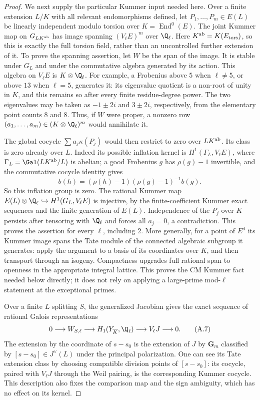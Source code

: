 \begin{proof}
We next supply the particular Kummer input needed here. Over a finite
extension $L/K$ with all relevant endomorphisms defined, let
$P_1,\ldots,P_m\in E(L)$ be linearly independent modulo torsion over
$K=\operatorname{End}^0(E)$. The joint Kummer map on
$G_{L K^{\rm ab}}$ has image spanning $(V_\ell E)^m$ over $\Q_\ell$.
Here $K^{\rm ab}=K(E_{\rm tors})$, so this is exactly the full torsion
field, rather than an uncontrolled further extension of it.
To prove the spanning assertion, let $W$ be the span of the image.
It is stable under $G_L$ and under the commutative algebra generated by
its action. This algebra on $V_\ell E$ is $K\otimes\Q_\ell$.
For example, a Frobenius above $5$ when $\ell\ne5$, or above $13$
when $\ell=5$, generates it: its eigenvalue quotient is a non-root of
unity in $K$, and this remains so after every finite residue-degree
power. The two eigenvalues may be taken as $-1\pm2i$ and $3\pm2i$,
respectively, from the elementary point counts $8$ and $8$.
Thus, if $W$ were proper, a nonzero row
$(a_1,\ldots,a_m)\in(K\otimes\Q_\ell)^m$ would annihilate it.

The global cocycle $\sum a_j\kappa(P_j)$ would then restrict to zero
over $LK^{\rm ab}$. Its class is zero already over $L$. Indeed its
possible inflation kernel is $H^1(\Gamma_L,V_\ell E)$, where
$\Gamma_L=\Gal(LK^{\rm ab}/L)$ is abelian; a good Frobenius $g$
has $\rho(g)-1$ invertible, and the commutative cocycle identity gives
\[
 b(h)=(\rho(h)-1)(\rho(g)-1)^{-1}b(g).
\]
So this inflation group is zero. The rational Kummer map
$E(L)\otimes\Q_\ell\hookrightarrow H^1(G_L,V_\ell E)$ is injective,
by the finite-coefficient Kummer exact sequences and the finite
generation of $E(L)$. Independence of the $P_j$ over $K$ persists
after tensoring with $\Q_\ell$ and forces all $a_j=0$, a contradiction.
This proves the assertion for every $\ell$, including $2$.
More generally, for a point of $E^d$ its Kummer image spans the Tate
module of the connected algebraic subgroup it generates: apply the
argument to a basis of its coordinates over $K$, and then transport
through an isogeny. Compactness upgrades full rational span to openness
in the appropriate integral lattice. This proves the CM Kummer fact
needed below directly; it does not rely on applying a large-prime
mod-$\ell$ statement at the exceptional primes.

Over a finite $L$ splitting $S$, the generalized Jacobian gives the exact
sequence of rational Galois representations
\[
 0\longrightarrow W_{S,\ell}\longrightarrow H_1(Y_{\overline K},\Q_\ell)
       \longrightarrow V_\ell J\longrightarrow0.         \tag{A.7}
\]
The extension by the coordinate of $s-s_0$ is the extension of $J$
by $\mathbf G_m$ classified by $[s-s_0]\in J^\vee(L)$ under the
principal polarization. One can see its Tate extension class by
choosing compatible division points of $[s-s_0]$: its cocycle, paired
with $V_\ell J$ through the Weil pairing, is the corresponding Kummer
cocycle. This description also fixes the comparison map and the sign
ambiguity, which has no effect on its kernel.


\end{proof}
